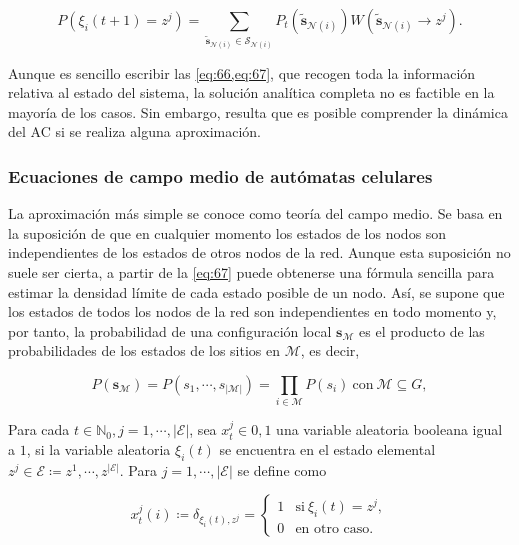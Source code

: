 \begin{equation}\label{eq:67}
	P\left(\xi_i(t+1)=z^j\right)=\sum_{\tilde{\mathbf{s}}_{\mathcal{N}(i)}\in\mathcal{S}_{\mathcal{N}(i)}}{P_t(\tilde{\mathbf{s}}_{\mathcal{N}(i)})W\left(\tilde{\mathbf{s}}_{\mathcal{N}(i)}\to z^j\right)}.
\end{equation}

Aunque es sencillo escribir las \cref{eq:66,eq:67}, que recogen toda la información relativa al estado del sistema, la solución analítica completa no es factible en la mayoría de los casos. Sin embargo, resulta que es posible comprender la dinámica del AC si se realiza alguna aproximación.

\subsubsection{Ecuaciones de campo medio de autómatas celulares}\label{sec:campo_medio}


La aproximación más simple se conoce como teoría del campo medio. Se basa en la suposición de que en cualquier momento los estados de los nodos son independientes de los estados de otros nodos de la red. Aunque esta suposición no suele ser cierta, a partir de  la \cref{eq:67} puede obtenerse una fórmula sencilla para estimar la densidad límite de cada estado posible de un nodo. Así, se supone que los estados de todos los nodos de la red son independientes en todo momento y, por tanto, la probabilidad de una configuración local $\mathbf{s}_\mathcal{M}$ es el producto de las probabilidades de los estados de los sitios en $\mathcal{M}$, es decir,

\begin{equation}\label{eq:68}
	P(\mathbf{s}_\mathcal{M})=P\left(s_1,\cdots,s_{\left| \mathcal{M}\right| }\right)=\prod_{i\in\mathcal{M}}{P(s_i)} \ \text{con} \ \mathcal{M}\subseteq G,
\end{equation}

Para cada $t\in\mathbb{N}_0, j=1,\cdots ,\left| \mathcal{E} \right|$,  sea $x_t^j \in {0, 1}$ una variable aleatoria booleana igual a $1$, si la variable aleatoria $\xi_i(t)$ se encuentra en el estado elemental $z^j \in \mathcal{E} \coloneqq {z^1 ,\cdots, z^{\left| \mathcal{E} \right| } }$. Para $j = 1,\cdots,\left| \mathcal{E}\right|$ se define como

\begin{equation}\label{eq:69}
	x_t^j(i)   \coloneqq \delta_{\xi_i(t),z^j}=\begin{cases}
		1 & \text{si} \ \xi_i(t)=z^j, \\
		0 & \text{en otro caso}.
	\end{cases}
\end{equation}

